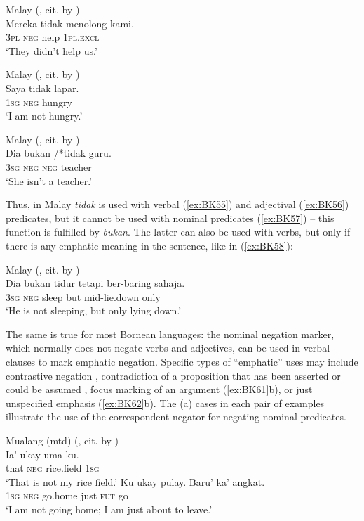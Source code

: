 \documentclass[output=paper,draft,draftmode,colorlinks,citecolor=brown]{langscibook}
\begin{document}
\ea Malay (\citealp[195]{sneddon1996a}, cit. by \citealp[1]{kroeger2014a}) \label{ex:BK55}\\
	\gll Mereka	tidak	menolong	kami.\\
	\textsc{3pl}			\textsc{neg}	help			\textsc{1pl.excl}\\
	\glt `They didn’t help us.'
\z

\ea Malay (\citealp[88]{sudaryono1993a}, cit. by \citealp[1]{kroeger2014a}) \label{ex:BK56}\\
	\gll Saya	tidak	lapar.\\
	\textsc{1sg}	\textsc{neg}	hungry\\
	\glt `I am not hungry.'
\z

\ea Malay (\citealp[195]{sneddon1996a}, cit. by \citealp[1]{kroeger2014a}) \label{ex:BK57}\\
	\gll Dia	bukan	/*tidak	guru.\\
	\textsc{3sg}	\textsc{neg}		\textsc{neg}		teacher\\
	\glt `She isn’t a teacher.'
\z


Thus, in Malay \textit{tidak} is used with verbal (\ref{ex:BK55}) and adjectival (\ref{ex:BK56}) predicates, but it cannot be used with nominal predicates (\ref{ex:BK57}) – this function is fulfilled by \textit{bukan}. The latter can also be used with verbs, but only if there is any emphatic meaning in the sentence, like in (\ref{ex:BK58}):

\ea Malay (\citealp[145]{asmahhj1982a}, cit. by \citealp[1]{kroeger2014a}) \label{ex:BK58}\\
	\gll Dia	bukan	tidur	tetapi		ber-baring		sahaja.\\
	\textsc{3sg}	\textsc{neg}		sleep	but		mid-lie.down	only\\
	\glt `He is not sleeping, but only lying down.'
\z

The same is true for most Bornean languages: the nominal negation marker, which normally does not negate verbs and adjectives, can be used in verbal clauses to mark emphatic negation. Specific types of “emphatic” uses may include contrastive negation , contradiction of a proposition that has been asserted or could be assumed , focus marking of an argument (\ref{ex:BK61}b), or just unspecified emphasis (\ref{ex:BK62}b). The (a) cases in each pair of examples illustrate the use of the correspondent negator for negating nominal predicates.


\ea Mualang (mtd) (\citealp[examples 9–102, 110]{tjia2007a}, cit. by \citealt[5]{Kroeger2014}) \label{ex:BK59}\\
  \ea\label{ex:BK59a}
	\gll Ia’		ukay	uma			ku.\\
	that	\textsc{neg}	rice.field	\textsc{1sg}\\
	\glt `That is not my rice field.'
  \ex\label{ex:BK59b}
	\gll Ku		ukay	pulay.		Baru’		ka’	angkat.\\
	\textsc{1sg}	\textsc{neg}	go.home		just		\textsc{fut}	go\\
	\glt `I am not going home; I am just about to leave.'
\z \z
\end{document}
